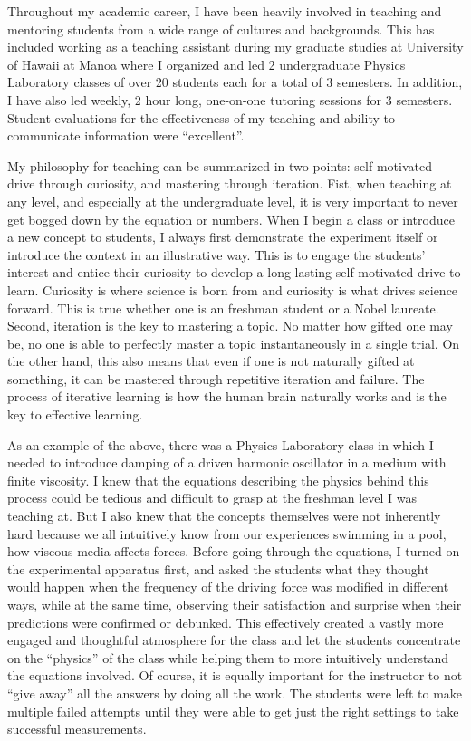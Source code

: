 \documentclass[10pt]{article} %
\begin{document}
Throughout my academic career, I have been heavily involved in teaching and
mentoring students from a wide range of cultures and backgrounds. This has
included working as a teaching assistant during my graduate studies at
University of Hawaii at Manoa where I organized and led 2 undergraduate Physics
Laboratory classes of over 20 students each for a total of 3 semesters. In
addition, I have also led weekly, 2 hour long, one-on-one tutoring sessions for
3 semesters. Student evaluations for the effectiveness of my teaching and
ability to communicate information were ``excellent''.

My philosophy for teaching can be summarized in two points: self motivated
drive through curiosity, and mastering through iteration. Fist, when teaching
at any level, and especially at the undergraduate level, it is very important
to never get bogged down by the equation or numbers. When I begin a class or
introduce a new concept to students, I always first demonstrate the experiment
itself or introduce the context in an illustrative way. This is to engage the
students’ interest and entice their curiosity to develop a long lasting self
motivated drive to learn. Curiosity is where science is born from and curiosity
is what drives science forward. This is true whether one is an freshman student
or a Nobel laureate. Second, iteration is the key to mastering a topic. No
matter how gifted one may be, no one is able to perfectly master a topic
instantaneously in a single trial. On the other hand, this also means that even
if one is not naturally gifted at something, it can be mastered through
repetitive iteration and failure. The process of iterative learning is how the
human brain naturally works and is the key to effective learning.

As an example of the above, there was a Physics Laboratory class in which I
needed to introduce damping of a driven harmonic oscillator in a medium with
finite viscosity. I knew that the equations describing the physics behind this
process could be tedious and difficult to grasp at the freshman level I was
teaching at. But I also knew that the concepts themselves were not inherently
hard because we all intuitively know from our experiences swimming in a pool,
how viscous media affects forces. Before going through the equations, I turned
on the experimental apparatus first, and asked the students what they thought
would happen when the frequency of the driving force was modified in different
ways, while at the same time, observing their satisfaction and surprise when
their predictions were confirmed or debunked. This effectively created a vastly
more engaged and thoughtful atmosphere for the class and let the students
concentrate on the ``physics'' of the class while helping them to more
intuitively understand the equations involved. Of course, it is equally
important for the instructor to not ``give away'' all the answers by doing all
the work. The students were left to make multiple failed attempts until they
were able to get just the right settings to take successful measurements.
\end{document}
